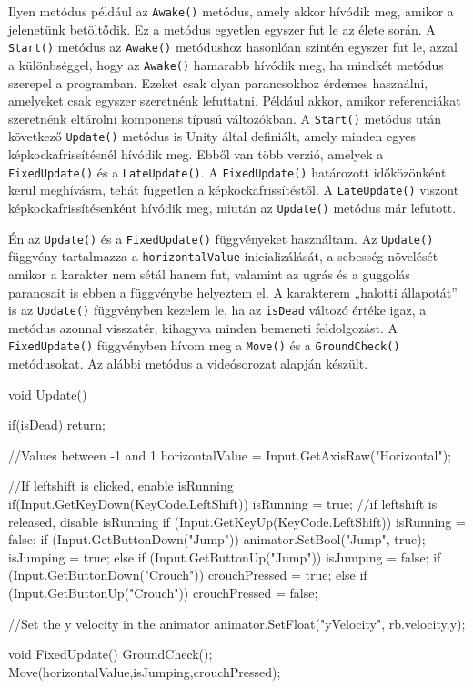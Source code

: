 Ilyen metódus például az \texttt{Awake()} metódus, amely akkor hívódik meg, amikor a jelenetünk betöltődik. Ez a metódus egyetlen egyszer fut le az élete során. A \texttt{Start()} metódus az \texttt{Awake()} metódushoz hasonlóan szintén egyszer fut le, azzal a különbséggel, hogy az \texttt{Awake()} hamarabb hívódik meg, ha mindkét metódus szerepel a programban. Ezeket csak olyan parancsokhoz érdemes használni, amelyeket csak egyszer szeretnénk lefuttatni. Például akkor, amikor referenciákat szeretnénk eltárolni komponens típusú változókban. A \texttt{Start()} metódus után következő \texttt{Update()} metódus is Unity által definiált, amely minden egyes képkockafrissítésnél hívódik meg. Ebből van több verzió, amelyek a \texttt{FixedUpdate()} és a \texttt{LateUpdate()}. A \texttt{FixedUpdate()} határozott időközönként kerül meghívásra, tehát független a képkockafrissítéstől. A \texttt{LateUpdate()} viszont képkockafrissítésenként hívódik meg, miután az \texttt{Update()} metódus már lefutott. 

Én az \texttt{Update()} és a \texttt{FixedUpdate()} függvényeket használtam. Az \texttt{Update()} függvény tartalmazza a \texttt{horizontalValue} inicializálását, a sebesség növelését amikor a karakter nem sétál hanem fut, valamint az ugrás és a guggolás parancsait is ebben a függvénybe helyeztem el. A karakterem „halotti állapotát” is az \texttt{Update()} függvényben kezelem le, ha az \texttt{isDead} változó értéke igaz, a metódus azonnal visszatér, kihagyva minden bemeneti feldolgozást. A \texttt{FixedUpdate()} függvényben hívom meg a \texttt{Move()} és a \texttt{GroundCheck()} metódusokat. Az alábbi metódus a \cite{youtubeplaylist} videósorozat alapján készült.

\begin{java}
 void Update()
 {
     if(isDead) return;

     //Values between -1 and 1 
     horizontalValue = Input.GetAxisRaw("Horizontal");

     //If leftshift is clicked, enable isRunning
     if(Input.GetKeyDown(KeyCode.LeftShift))
     {
         isRunning = true;
     }
     //if leftshift is released, disable isRunning
     if (Input.GetKeyUp(KeyCode.LeftShift))
     {
         isRunning = false;
     }
     if (Input.GetButtonDown("Jump"))
     {
         animator.SetBool("Jump", true);
         isJumping = true;
     }
     else if (Input.GetButtonUp("Jump"))
     {
         isJumping = false;
     }
     if (Input.GetButtonDown("Crouch"))
     {
         crouchPressed = true;
     }
     else if (Input.GetButtonUp("Crouch"))
     {
         crouchPressed = false;
     }

     //Set the y velocity in the animator
     animator.SetFloat("yVelocity", rb.velocity.y);

 }

 void FixedUpdate()
 {
     GroundCheck();
     Move(horizontalValue,isJumping,crouchPressed);
 }
\end{java}

